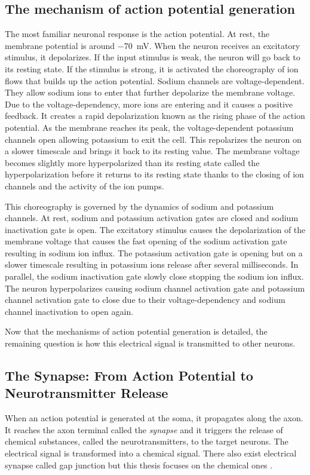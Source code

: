 \subsection{The mechanism of action potential generation}
The most familiar neuronal response is the action potential. At rest, the membrane potential is around \SI{-70}{mV}. When the neuron receives an excitatory stimulus, it depolarizes. If the input stimulus is weak, the neuron will go back to its resting state. If the stimulus is strong, it is activated the choreography of ion flows that builds up the action potential. Sodium channels are voltage-dependent. They allow sodium ions to enter that further depolarize the membrane voltage. Due to the voltage-dependency, more ions are entering and it causes a positive feedback. It creates a rapid depolarization known as the rising phase of the action potential. As the membrane reaches its peak, the voltage-dependent potassium channels open allowing potassium to exit the cell. This repolarizes the neuron on a slower timescale and brings it back to its resting value. The membrane voltage becomes slightly more hyperpolarized than its resting state called the hyperpolarization before it returns to its resting state thanks to the closing of ion channels and the activity of the ion pumps. 

This choreography is governed by the dynamics of sodium and potassium channels. At rest, sodium and potassium activation gates are closed and sodium inactivation gate is open. The excitatory stimulus causes the depolarization of the membrane voltage that causes the fast opening of the sodium activation gate resulting in sodium ion influx. The potassium activation gate is opening but on a slower timescale resulting in potassium ions release after several milliseconds. In parallel, the sodium inactivation gate slowly close stopping the sodium ion influx. The neuron hyperpolarizes causing sodium channel activation gate and potassium channel activation gate to close due to their voltage-dependency and sodium channel inactivation to open again. 

Now that the mechanisms of action potential generation is detailed, the remaining question is how this electrical signal is transmitted to other neurons. 


\subsection{The Synapse: From Action Potential to Neurotransmitter Release}
When an action potential is generated at the soma, it propagates along the axon. It reaches the axon terminal called the \textit{synapse} and it triggers the release of chemical substances, called the neurotransmitters, to the target neurons. The electrical signal is transformed into a chemical signal. There also exist electrical synapse called gap junction but this thesis focuses on the chemical ones \citep{heidelberger_synaptic_2014}. 

